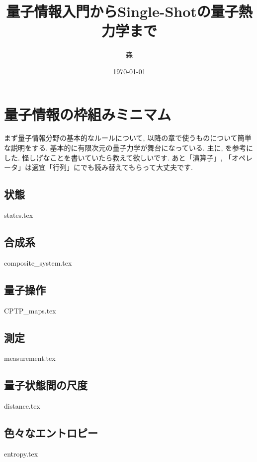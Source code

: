 \documentclass[report]{jlreq}
\title{量子情報入門からSingle-Shotの量子熱力学まで}
\author{森}
\date{\today}
\begin{document}
\maketitle

\setcounter{tocdepth}{1}
\thispagestyle{TOC}
\tableofcontents


\pagestyle{mystyle}
\chapter{量子情報の枠組みミニマム}\label{chap.quantum_info_basic}
まず量子情報分野の基本的なルールについて, 以降の章で使うものについて簡単な説明をする. 
基本的に有限次元の量子力学が舞台になっている. 
主に\cite{nielsen2010quantum}, \cite{SagawaEntropy}を参考にした. 
怪しげなことを書いていたら教えて欲しいです. 
あと「演算子」, 「オペレータ」は適宜「行列」にでも読み替えてもらって大丈夫です. 
\section{状態}
{states.tex}
\section{合成系}
{composite_system.tex}
\section{量子操作}
{CPTP_maps.tex}
\section{測定}
{measurement.tex}
\section{量子状態間の尺度}
{distance.tex}
\section{色々なエントロピー}\label{sec.entropy}
{entropy.tex}
\end{document}

